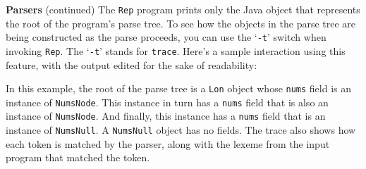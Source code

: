 \begin{minipage}[t]{\sw}
\slidenumber
\LARGE
{\bf Parsers} (continued)\exx
\Large
\emm\LightBox{\MYlonGrammarOnly}\exx
The \verb'Rep' program prints only
the Java object that represents the root of the program's parse tree.
To see how the objects in the parse tree are being constructed
as the parse proceeds,
you can use the `\verb'-t'' switch when invoking \verb'Rep'.
The `\verb'-t'' stands for \verb'trace'.
Here's a sample interaction using this feature,
with the output edited for the sake of readability:
In this example,
the root of the parse tree is a \verb'Lon' object
whose \verb'nums' field is an instance of \verb'NumsNode'.
This instance in turn has a \verb'nums' field that is also
an instance of \verb'NumsNode'.
And finally, this instance has a \verb'nums' field
that is an instance of \verb'NumsNull'.
A \verb'NumsNull' object has no fields.
The trace also shows how each token is matched by the parser,
along with the lexeme
from the input program that matched the token.
\end{minipage}
\clearpage
